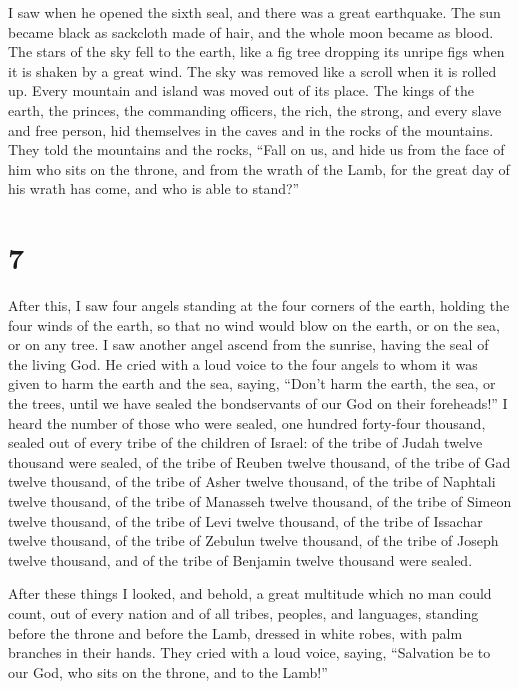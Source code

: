  I saw when he opened the sixth seal, and there was a
great earthquake. The sun became black as sackcloth made of hair, and
the whole moon became as blood.  The stars of the sky
fell to the earth, like a fig tree dropping its unripe figs when it is
shaken by a great wind.  The sky was removed like a
scroll when it is rolled up. Every mountain and island was moved out of
its place.  The kings of the earth, the princes, the
commanding officers, the rich, the strong, and every slave and free
person, hid themselves in the caves and in the rocks of the mountains.
 They told the mountains and the rocks, ``Fall on us, and
hide us from the face of him who sits on the throne, and from the wrath
of the Lamb,  for the great day of his wrath has come,
and who is able to stand?''

\hypertarget{section-6}{%
\section{7}\label{section-6}}

 After this, I saw four angels standing at the four
corners of the earth, holding the four winds of the earth, so that no
wind would blow on the earth, or on the sea, or on any tree.
 I saw another angel ascend from the sunrise, having the
seal of the living God. He cried with a loud voice to the four angels to
whom it was given to harm the earth and the sea,  saying,
``Don't harm the earth, the sea, or the trees, until we have sealed the
bondservants of our God on their foreheads!''  I heard the
number of those who were sealed, one hundred forty-four thousand, sealed
out of every tribe of the children of Israel:  of the
tribe of Judah twelve thousand were sealed, of the tribe of Reuben
twelve thousand, of the tribe of Gad twelve thousand,  of
the tribe of Asher twelve thousand, of the tribe of Naphtali twelve
thousand, of the tribe of Manasseh twelve thousand,  of
the tribe of Simeon twelve thousand, of the tribe of Levi twelve
thousand, of the tribe of Issachar twelve thousand,  of
the tribe of Zebulun twelve thousand, of the tribe of Joseph twelve
thousand, and of the tribe of Benjamin twelve thousand were sealed.

 After these things I looked, and behold, a great
multitude which no man could count, out of every nation and of all
tribes, peoples, and languages, standing before the throne and before
the Lamb, dressed in white robes, with palm branches in their hands.
 They cried with a loud voice, saying, ``Salvation be to
our God, who sits on the throne, and to the Lamb!''

